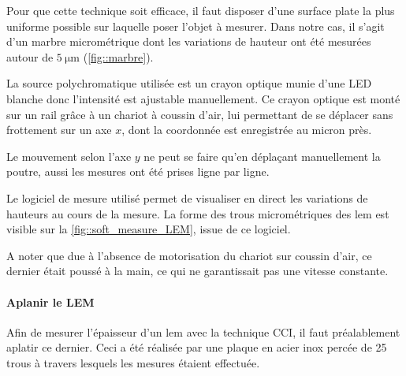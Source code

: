                     Pour que cette technique soit efficace, il faut disposer d'une surface plate la plus uniforme possible sur laquelle poser l'objet à mesurer. Dans notre cas, il s'agit d'un marbre micrométrique dont les variations de hauteur ont été mesurées autour de $\SI{5}{\micro\meter}$ (\autoref{fig::marbre}).
                    
                    La source polychromatique utilisée est un crayon optique munie d'une LED blanche donc l'intensité est ajustable manuellement. Ce crayon optique est monté sur un rail grâce à un chariot à coussin d'air, lui permettant de se déplacer sans frottement sur un axe $x$, dont la coordonnée est enregistrée au micron près.
                    
                    Le mouvement selon l'axe $y$ ne peut se faire qu'en déplaçant manuellement la poutre, aussi les mesures ont été prises ligne par ligne.
                    
                    Le logiciel de mesure utilisé permet de visualiser en direct les variations de hauteurs au cours de la mesure. La forme des trous micrométriques des \gls{lem} est visible sur la \autoref{fig::soft_measure_LEM}, issue de ce logiciel. 
                    
                    A noter que due à l'absence de motorisation du chariot sur coussin d'air, ce dernier était poussé à la main, ce qui ne garantissait pas une vitesse constante.
                    
                \paragraph{Aplanir le LEM}
                    
                    Afin de mesurer l'épaisseur d'un \gls{lem} avec la technique CCI, il faut préalablement aplatir ce dernier. Ceci a été réalisée par une plaque en acier inox percée de 25 trous à travers lesquels les mesures étaient effectuée. 
                    
                    
